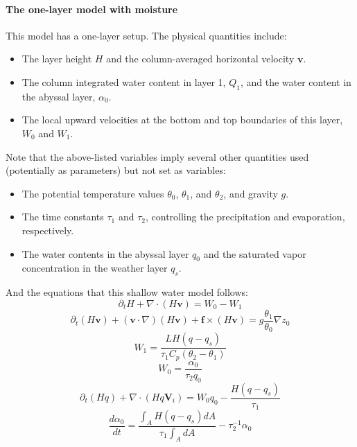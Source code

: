 \documentclass{article}
\begin{document}
\paragraph{The one-layer model with moisture} This model has a one-layer setup. The physical quantities include:
\begin{itemize}
    \item The layer height $H$ and the column-averaged horizontal velocity $\mathbf{v}$.
    \item The column integrated water content in layer 1, $Q_1$, and the water content in the abyssal layer, $\alpha_0$.
    \item The local upward velocities at the bottom and top boundaries of this layer, $W_0$ and $W_1$.
\end{itemize}
Note that the above-listed variables imply several other quantities used (potentially as parameters) but not set as variables:
\begin{itemize}
    \item The potential temperature values $\theta_0$, $\theta_1$, and $\theta_2$, and gravity $g$.
    \item The time constants $\tau_1$ and $\tau_2$, controlling the precipitation and evaporation, respectively.
    \item The water contents in the abyssal layer $q_0$ and the saturated vapor concentration in the weather layer $q_s$.
\end{itemize}
And the equations that this shallow water model follows:
\begin{equation}
    \partial_t H + \nabla\cdot(H\mathbf{v})=W_0-W_1
\end{equation}
\begin{equation}
    \partial_t (H\mathbf{v})+(\mathbf{v}\cdot\nabla)(H\mathbf{v})+\mathbf{f}\times(H\mathbf{v})=g\frac{\theta_1}{\theta_0}\nabla z_0
\end{equation}
\begin{equation}
    W_1=\frac{LH(q-q_s)}{\tau_1 C_p(\theta_2-\theta_1)}
\end{equation}
\begin{equation}
    W_0=\frac{\alpha_0}{\tau_2 q_0}
\end{equation}
\begin{equation}
    \partial_t (Hq)+\nabla\cdot(Hq\mathbf{V}_i)=W_0 q_0-\frac{H(q-q_s)}{\tau_1}
\end{equation}
\begin{equation}
    \frac{d\alpha_0}{dt}=\frac{\int_A H(q-q_s)dA}{\tau_1\int_A dA} - \tau_2^{-1}\alpha_0
\end{equation}
\end{document}
